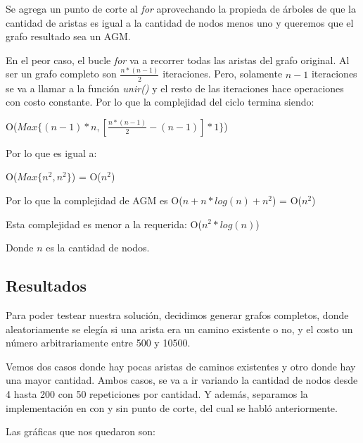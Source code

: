 \begin{itemize}
\quad Se agrega un punto de corte al \textit{for} aprovechando la propieda de \'arboles de que la cantidad de aristas es igual a la cantidad de nodos menos uno y queremos que el grafo resultado sea un AGM.

\quad

\quad En el peor caso, el bucle \textit{for} va a recorrer todas las aristas del grafo original. Al ser un grafo completo son $ \frac{n * (n - 1)}{2} $ iteraciones. Pero, solamente $ n-1 $ iteraciones se va a llamar a la funci\'on \textit{unir()} y el resto de las iteraciones hace operaciones con costo constante. Por lo que la complejidad del ciclo termina siendo:

\quad 

 O($ Max\lbrace (n-1)\ast n, [\frac{n * (n - 1)}{2} - (n-1)] \ast 1 \rbrace $)

\quad

Por lo que es igual a:

\quad

O($ Max\lbrace n^2, n^2 \rbrace $) = O($ n^2 $)

\quad

\quad Por lo que la complejidad de AGM es O($ n +  n \ast log(n) + n^2$) = O($ n^2 $)

\quad Esta complejidad es menor a la requerida: O($ n^{2} \ast log(n)$)

\quad Donde $ n $ es la cantidad de nodos.

\end{itemize}


\subsection{Resultados}

\quad Para poder testear nuestra soluci\'on, decidimos generar grafos completos, donde aleatoriamente se eleg\'ia si una arista era un camino existente o no, y el costo un n\'umero arbitrariamente entre 500 y 10500. 

\quad

\quad Vemos dos casos donde hay pocas aristas de caminos existentes y otro donde hay una mayor cantidad. Ambos casos, se va a ir variando la cantidad de nodos desde 4 hasta 200 con 50 repeticiones por cantidad. Y adem\'as, separamos la implementaci\'on en con y sin punto de corte, del cual se habló anteriormente.

\quad

\quad Las gr\'aficas que nos quedaron son:

